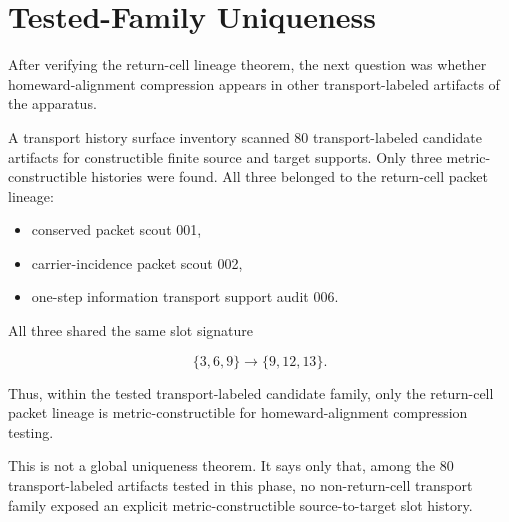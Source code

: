 \section{Tested-Family Uniqueness}

After verifying the return-cell lineage theorem, the next question was whether
homeward-alignment compression appears in other transport-labeled artifacts of
the apparatus.

A transport history surface inventory scanned 80 transport-labeled candidate
artifacts for constructible finite source and target supports. Only three
metric-constructible histories were found. All three belonged to the
return-cell packet lineage:

\begin{itemize}
  \item conserved packet scout 001,
  \item carrier-incidence packet scout 002,
  \item one-step information transport support audit 006.
\end{itemize}

All three shared the same slot signature

\[
\{3,6,9\} \rightarrow \{9,12,13\}.
\]

Thus, within the tested transport-labeled candidate family, only the
return-cell packet lineage is metric-constructible for homeward-alignment
compression testing.

This is not a global uniqueness theorem. It says only that, among the 80
transport-labeled artifacts tested in this phase, no non-return-cell transport
family exposed an explicit metric-constructible source-to-target slot history.
